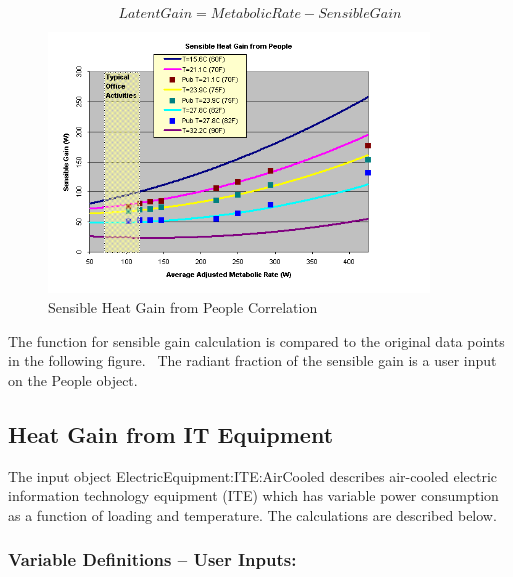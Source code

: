 \begin{equation}
LatentGain = MetabolicRate - SensibleGain
\end{equation}

\begin{figure}[hbtp] %
\centering
\includegraphics[width=0.9\textwidth, height=0.9\textheight, keepaspectratio=true]{media/image5820.png}
\caption{  Sensible Heat Gain from People Correlation \protect \label{fig:sensible-heat-gain-from-people-correlation}}
\end{figure}

The function for sensible gain calculation is compared to the original data points in the following figure.~ The radiant fraction of the sensible gain is a user input on the People object.

\subsection{Heat Gain from IT Equipment}\label{heat-gain-from-it-equipment}

The input object ElectricEquipment:ITE:AirCooled describes air-cooled electric information technology equipment (ITE) which has variable power consumption as a function of loading and temperature. The calculations are described below.

\subsubsection{Variable Definitions -- User Inputs:}\label{variable-definitions-user-inputs}

